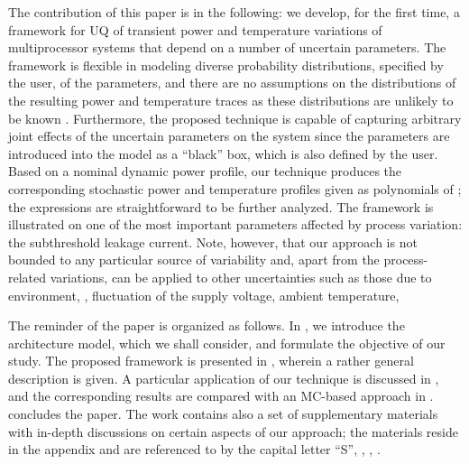 The contribution of this paper is in the following: we develop, for the first time, a framework for UQ of transient power and temperature variations of multiprocessor systems that depend on a number of uncertain parameters. The framework is flexible in modeling diverse probability distributions, specified by the user, of the parameters, and there are no assumptions on the distributions of the resulting power and temperature traces as these distributions are unlikely to be known \apriori. Furthermore, the proposed technique is capable of capturing arbitrary joint effects of the uncertain parameters on the system since the parameters are introduced into the model as a ``black'' box, which is also defined by the user. Based on a nominal dynamic power profile, our technique produces the corresponding stochastic power and temperature profiles given as polynomials of \rvs; the expressions are straightforward to be further analyzed. The framework is illustrated on one of the most important parameters affected by process variation: the subthreshold leakage current. Note, however, that our approach is not bounded to any particular source of variability and, apart from the process-related variations, can be applied to other uncertainties such as those due to environment, \ie, fluctuation of the supply voltage, ambient temperature, \etc


The reminder of the paper is organized as follows. In , we introduce the architecture model, which we shall consider, and formulate the objective of our study. The proposed framework is presented in , wherein a rather general description is given. A particular application of our technique is discussed in , and the corresponding results are compared with an MC-based approach in .  concludes the paper. The work contains also a set of supplementary materials with in-depth discussions on certain aspects of our approach; the materials reside in the appendix and are referenced to by the capital letter ``S'', \eg, , .
